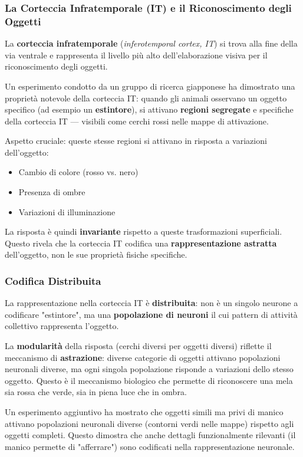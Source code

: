 \subsubsection{La Corteccia Infratemporale (IT) e il Riconoscimento degli Oggetti}

La \textbf{corteccia infratemporale} (\textit{inferotemporal cortex, IT}) si trova alla fine della via ventrale e rappresenta il livello più alto dell'elaborazione visiva per il riconoscimento degli oggetti.

Un esperimento condotto da un gruppo di ricerca giapponese ha dimostrato una proprietà notevole della corteccia IT: quando gli animali osservano un oggetto specifico (ad esempio un \textbf{estintore}), si attivano \textbf{regioni segregate} e specifiche della corteccia IT — visibili come cerchi rossi nelle mappe di attivazione.

Aspetto cruciale: queste stesse regioni si attivano in risposta a variazioni dell'oggetto:
\begin{itemize}
    \item Cambio di colore (rosso vs. nero)
    \item Presenza di ombre
    \item Variazioni di illuminazione
\end{itemize}

La risposta è quindi \textbf{invariante} rispetto a queste trasformazioni superficiali. Questo rivela che la corteccia IT codifica una \textbf{rappresentazione astratta} dell'oggetto, non le sue proprietà fisiche specifiche.

\subsubsection{Codifica Distribuita}

La rappresentazione nella corteccia IT è \textbf{distribuita}: non è un singolo neurone a codificare "estintore", ma una \textbf{popolazione di neuroni} il cui pattern di attività collettivo rappresenta l'oggetto.

La \textbf{modularità} della risposta (cerchi diversi per oggetti diversi) riflette il meccanismo di \textbf{astrazione}: diverse categorie di oggetti attivano popolazioni neuronali diverse, ma ogni singola popolazione risponde a variazioni dello stesso oggetto. Questo è il meccanismo biologico che permette di riconoscere una mela sia rossa che verde, sia in piena luce che in ombra.

\begin{tcolorbox}[colback=gray!5, colframe=gray!40, arc=2mm, boxrule=0.5pt]
Un esperimento aggiuntivo ha mostrato che oggetti simili ma privi di manico attivano popolazioni neuronali diverse (contorni verdi nelle mappe) rispetto agli oggetti completi. Questo dimostra che anche dettagli funzionalmente rilevanti (il manico permette di "afferrare") sono codificati nella rappresentazione neuronale.
\end{tcolorbox}


